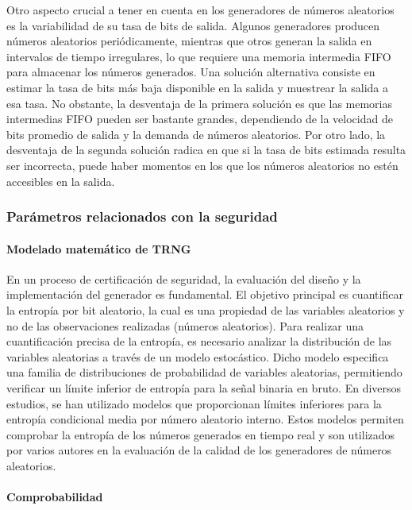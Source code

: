                 Otro aspecto crucial a tener en cuenta en los generadores de números aleatorios es la variabilidad de su tasa de bits de salida. Algunos generadores producen números aleatorios periódicamente, mientras que otros generan la salida en intervalos de tiempo irregulares, lo que requiere una memoria intermedia FIFO para almacenar los números generados. Una solución alternativa consiste en estimar la tasa de bits más baja disponible en la salida y muestrear la salida a esa tasa. No obstante, la desventaja de la primera solución es que las memorias intermedias FIFO pueden ser bastante grandes, dependiendo de la velocidad de bits promedio de salida y la demanda de números aleatorios. Por otro lado, la desventaja de la segunda solución radica en que si la tasa de bits estimada resulta ser incorrecta, puede haber momentos en los que los números aleatorios no estén accesibles en la salida.
	
            \subsubsection{Parámetros relacionados con la seguridad}
	
	            \paragraph{Modelado matemático de TRNG\\}
                
                En un proceso de certificación de seguridad, la evaluación del diseño y la implementación del generador es fundamental. El objetivo principal es cuantificar la entropía por bit aleatorio, la cual es una propiedad de las variables aleatorios y no de las observaciones realizadas (números aleatorios). Para realizar una cuantificación precisa de la entropía, es necesario analizar la distribución de las variables aleatorias a través de un modelo estocástico. Dicho modelo especifica una familia de distribuciones de probabilidad de variables aleatorias, permitiendo verificar un límite inferior de entropía para la señal binaria en bruto. En diversos estudios, se han utilizado modelos que proporcionan límites inferiores para la entropía condicional media por número aleatorio interno. Estos modelos permiten comprobar la entropía de los números generados en tiempo real y son utilizados por varios autores en la evaluación de la calidad de los generadores de números aleatorios.

	            \paragraph{Comprobabilidad\\}

